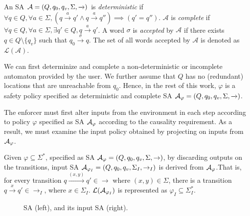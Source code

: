 An SA ${\cal A} = (Q, q_0, q_v, \Sigma, \xrightarrow{})$ is \textit{deterministic} if $\forall
q \in Q, \forall a \in \Sigma, (q \xrightarrow{a} q' \land q \xrightarrow{a}
q'') \implies (q' = q'')$.
$\mathcal{A}$ is \textit{complete} if $\forall q \in Q, \forall a \in \Sigma, \exists q' \in Q, q \xrightarrow{a} q'$.
A word $\sigma$ is \textit{accepted} by $\mathcal{A}$ if there exists $q \in Q \setminus \{q_v\}$ such that $q_0
\xrightarrow{\sigma} q$.
The set of all words accepted by $\mathcal{A}$ is denoted as $\mathcal{L}(\mathcal{A})$.

\begin{remark}
	We can first determinize and complete a non-deterministic or incomplete automaton provided by the user.
	We further assume that $Q$ has no (redundant) locations that are
	unreachable from $q_0$. Hence, in the rest of this work, $\varphi$ is a safety policy specified as deterministic and complete SA ${\cal A}_\varphi = (Q, q_0, q_v, \Sigma, \xrightarrow{})$. 
\end{remark}

The enforcer must first alter inputs from the environment in each step according to policy $\varphi$ specified as SA ${\cal A}_\varphi$ according to the causality requirement.
As a result, we must examine the input policy obtained by projecting
on inputs from ${\cal A}_\varphi$. 

\begin{definition}
	\label{def:inp:prop:proj:def}
	Given $\varphi\subseteq\Sigma^*$, specified as SA ${\cal A}_{\varphi}=(Q, q_0, q_v, \Sigma, \rightarrow)$,  by discarding outputs on the transitions, input SA ${\cal A}_{\varphi_I}=(Q, q_0, q_v, \Sigma_I, \rightarrow_I)$ is derived from ${\cal A}_{\varphi}$.That is, for every transition  $q \xrightarrow{(x,y)} q' \in \rightarrow$ where $(x,y) \in \Sigma$, there is a transition  $q \xrightarrow{x} q' \in \rightarrow_I$, where $x \in \Sigma_I$.
	${\cal L}({\cal A}_{\varphi_I})$ is represented as $\varphi_I \subseteq \Sigma_I^*$.
\end{definition}

\begin{figure}[htb]
	\centering
	\hspace{-4.0em}
	\caption[]{SA (left), and its input SA (right). \footnotemark}
	\label{fig:prop:inpProj}
\end{figure}

